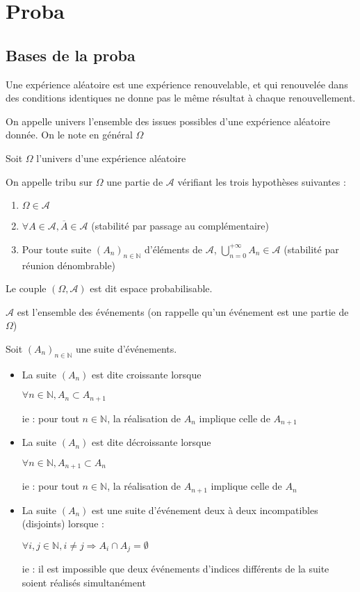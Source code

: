 \documentclass[a4paper,12pt]{book}
\newcommand{\Def}[2]{\begin{tcolorbox}[colback=white,colframe=red!10!green!20!blue!75!, title=Définition : #1]#2\end{tcolorbox}}
\def\N{\mathbb{N}}
\begin{document}
\chapter{Proba}
\section{Bases de la proba}
\Def{}{Une expérience aléatoire est une expérience renouvelable, et qui renouvelée dans des conditions identiques ne donne pas le même résultat à chaque renouvellement.}
\Def{}{On appelle univers l'ensemble des issues possibles d'une expérience aléatoire donnée. On le note en général $\Omega$}
\Def{}{Soit $\Omega$ l'univers d'une expérience aléatoire
\par On appelle tribu sur $\Omega$ une partie de $\mathcal{A}$ vérifiant les trois hypothèses suivantes :\begin{enumerate}
\item $\Omega\in \mathcal{A}$
\item $\forall A\in \mathcal{A},\overline{A}\in \mathcal{A}$ (stabilité par passage au complémentaire)
\item Pour toute suite $(A_n)_{n\in\N}$ d'éléments de $\mathcal{A}$, $\bigcup_{n=0}^{+\infty}A_n\in\mathcal{A}$ (stabilité par réunion dénombrable)
\end{enumerate}
Le couple $(\Omega, \mathcal{A})$ est dit espace probabilisable.
\par $\mathcal{A}$ est l'ensemble des événements (on rappelle qu'un événement est une partie de $\Omega$)}
\Def{}{Soit $(A_n)_{n\in\N}$ une suite d'événements.\begin{itemize}
\item La suite $(A_n)$ est dite croissante lorsque \par\begin{center}$\forall n\in\N, A_n\subset A_{n+1}$\end{center} \par ie : pour tout $n\in\N$, la réalisation de $A_n$ implique celle de $A_{n+1}$
\item La suite $(A_n)$ est dite décroissante lorsque \par\begin{center}$\forall n\in\N, A_{n+1}\subset A_{n}$\end{center} \par ie : pour tout $n\in\N$, la réalisation de $A_{n+1}$ implique celle de $A_{n}$
\item La suite $(A_n)$ est une suite d'événement deux à deux incompatibles (disjoints) lorsque : \par\begin{center}$\forall i,j\in\N, i\neq j\Rightarrow A_i\cap A_j=\emptyset$\end{center} \par ie : il est impossible que deux événements d'indices différents de la suite soient réalisés simultanément
\end{itemize}}
\end{document}
